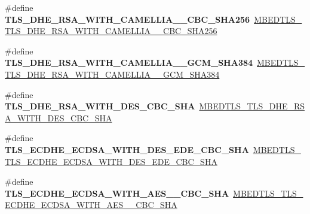 \begin{DoxyCompactItemize}
\item 
\mbox{\label{compat-1_83_8h_aac266cf5d51ae6f91c41a8de48ea3067}} 
\#define {\bfseries T\+L\+S\+\_\+\+D\+H\+E\+\_\+\+R\+S\+A\+\_\+\+W\+I\+T\+H\+\_\+\+C\+A\+M\+E\+L\+L\+I\+A\+\_\+\_\+\+C\+B\+C\+\_\+\+S\+H\+A256}~\mbox{\hyperlink{ssl__ciphersuites_8h_a0384999299d42ddad6da4d48b5fd2560}{M\+B\+E\+D\+T\+L\+S\+\_\+\+T\+L\+S\+\_\+\+D\+H\+E\+\_\+\+R\+S\+A\+\_\+\+W\+I\+T\+H\+\_\+\+C\+A\+M\+E\+L\+L\+I\+A\+\_\+\_\+\+C\+B\+C\+\_\+\+S\+H\+A256}}
\item 
\mbox{\label{compat-1_83_8h_a793747467af310fc48d92c1e6cb2ac03}} 
\#define {\bfseries T\+L\+S\+\_\+\+D\+H\+E\+\_\+\+R\+S\+A\+\_\+\+W\+I\+T\+H\+\_\+\+C\+A\+M\+E\+L\+L\+I\+A\+\_\+\_\+\+G\+C\+M\+\_\+\+S\+H\+A384}~\mbox{\hyperlink{ssl__ciphersuites_8h_a8aae9417cd05c572ab5c8fc8459f95bc}{M\+B\+E\+D\+T\+L\+S\+\_\+\+T\+L\+S\+\_\+\+D\+H\+E\+\_\+\+R\+S\+A\+\_\+\+W\+I\+T\+H\+\_\+\+C\+A\+M\+E\+L\+L\+I\+A\+\_\+\_\+\+G\+C\+M\+\_\+\+S\+H\+A384}}
\item 
\mbox{\label{compat-1_83_8h_a29767f3430ead8364105e7099e846be4}} 
\#define {\bfseries T\+L\+S\+\_\+\+D\+H\+E\+\_\+\+R\+S\+A\+\_\+\+W\+I\+T\+H\+\_\+\+D\+E\+S\+\_\+\+C\+B\+C\+\_\+\+S\+HA}~\mbox{\hyperlink{ssl__ciphersuites_8h_ab15d94b2d3e7a8108970983d58594fa2}{M\+B\+E\+D\+T\+L\+S\+\_\+\+T\+L\+S\+\_\+\+D\+H\+E\+\_\+\+R\+S\+A\+\_\+\+W\+I\+T\+H\+\_\+\+D\+E\+S\+\_\+\+C\+B\+C\+\_\+\+S\+HA}}
\item 
\mbox{\label{compat-1_83_8h_a57c9dbc1589e5dc5e2e854e7775d539c}} 
\#define {\bfseries T\+L\+S\+\_\+\+E\+C\+D\+H\+E\+\_\+\+E\+C\+D\+S\+A\+\_\+\+W\+I\+T\+H\+\_\+D\+E\+S\+\_\+\+E\+D\+E\+\_\+\+C\+B\+C\+\_\+\+S\+HA}~\mbox{\hyperlink{ssl__ciphersuites_8h_adefb72a7bd593f894e03d5061a1ffb72}{M\+B\+E\+D\+T\+L\+S\+\_\+\+T\+L\+S\+\_\+\+E\+C\+D\+H\+E\+\_\+\+E\+C\+D\+S\+A\+\_\+\+W\+I\+T\+H\+\_\+D\+E\+S\+\_\+\+E\+D\+E\+\_\+\+C\+B\+C\+\_\+\+S\+HA}}
\item 
\mbox{\label{compat-1_83_8h_a5c065d6a1ed19fefcca6bf712188f2ea}} 
\#define {\bfseries T\+L\+S\+\_\+\+E\+C\+D\+H\+E\+\_\+\+E\+C\+D\+S\+A\+\_\+\+W\+I\+T\+H\+\_\+\+A\+E\+S\+\_\+\_\+\+C\+B\+C\+\_\+\+S\+HA}~\mbox{\hyperlink{ssl__ciphersuites_8h_a04628d6486564ca5f6d30f876fec72a9}{M\+B\+E\+D\+T\+L\+S\+\_\+\+T\+L\+S\+\_\+\+E\+C\+D\+H\+E\+\_\+\+E\+C\+D\+S\+A\+\_\+\+W\+I\+T\+H\+\_\+\+A\+E\+S\+\_\+\_\+\+C\+B\+C\+\_\+\+S\+HA}}

\end{DoxyCompactItemize}
